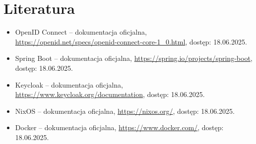 \documentclass[../../spr.tex]{subfiles}
\begin{document}
\newpage
\section{Literatura}
\begin{itemize}
  \item OpenID Connect -- dokumentacja oficjalna, \\ \url{https://openid.net/specs/openid-connect-core-1_0.html}, dostęp: 18.06.2025.
  \item Spring Boot -- dokumentacja oficjalna, \url{https://spring.io/projects/spring-boot}, dostęp: 18.06.2025.
  \item Keycloak -- dokumentacja oficjalna, \url{https://www.keycloak.org/documentation}, dostęp: 18.06.2025.
  \item NixOS -- dokumentacja oficjalna, \url{https://nixos.org/}, dostęp: 18.06.2025.
  \item Docker -- dokumentacja oficjalna, \url{https://www.docker.com/}, dostęp: 18.06.2025.
\end{itemize}
\end{document}
